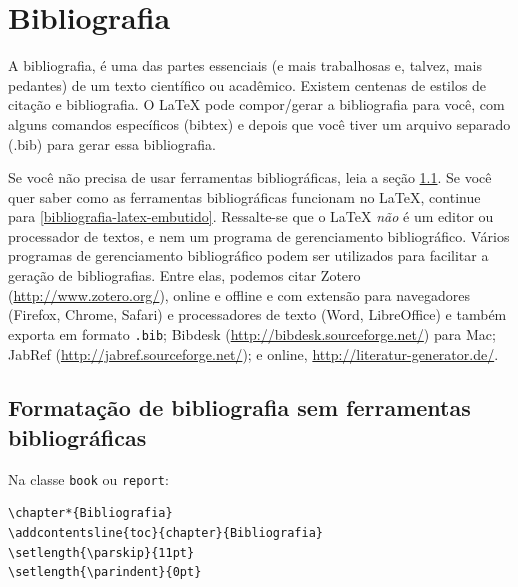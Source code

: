 \chapter{Bibliografia}
\label{bibliografia}
A bibliografia, é uma das partes essenciais (e mais trabalhosas e, talvez, mais pedantes) de um texto científico ou acadêmico. Existem centenas de estilos de citação e bibliografia. O \LaTeX{} pode compor/gerar a bibliografia para você, com alguns comandos específicos (bibtex) e depois que você tiver um arquivo separado (.bib) para gerar essa bibliografia. %

Se você não precisa de usar ferramentas bibliográficas, leia a seção \ref{bibliografia-manual}. Se você quer saber como as ferramentas bibliográficas funcionam no \LaTeX, continue para \ref{bibliografia-latex-embutido}. Ressalte-se que o \LaTeX{} \textit{não} é um editor ou processador de textos, e nem um programa de gerenciamento bibliográfico. Vários programas de gerenciamento bibliográfico podem ser utilizados para facilitar a geração de bibliografias. Entre elas, podemos citar Zotero (\url{http://www.zotero.org/}), online e offline e com extensão para navegadores (Firefox, Chrome, Safari) e processadores de texto (Word, LibreOffice) e também exporta em formato \texttt{.bib}; Bibdesk (\url{http://bibdesk.sourceforge.net/}) para Mac; JabRef (\url{http://jabref.sourceforge.net/}); e online, \url{http://literatur-generator.de/}.


\section{Formatação de bibliografia sem ferramentas bibliográficas}
\label{bibliografia-manual}


Na classe \texttt{book} ou \texttt{report}:

\begin{verbatim}
\chapter*{Bibliografia}
\addcontentsline{toc}{chapter}{Bibliografia}
\setlength{\parskip}{11pt}
\setlength{\parindent}{0pt}
\end{verbatim}

